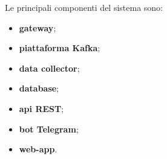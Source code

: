 		Le principali componenti del sistema sono:
		\begin{itemize}
		  	\item \textbf{gateway};
		  	\item \textbf{piattaforma Kafka};
		  	\item \textbf{data collector};
		  	\item \textbf{database};
		  	\item \textbf{api REST};
		  	\item \textbf{bot Telegram};
		  	\item \textbf{web-app}.    
		\end{itemize} 



			









